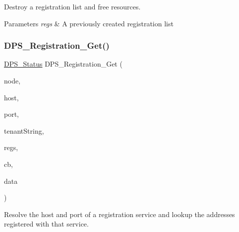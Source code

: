 Destroy a registration list and free resources. 


\begin{DoxyParams}{Parameters}
{\em regs} & A previously created registration list \\
\hline
\end{DoxyParams}
\mbox{\label{group__registration_ga7288d76e731feb67b22951d7d1966311}} 
\subsubsection{\texorpdfstring{D\+P\+S\+\_\+\+Registration\+\_\+\+Get()}{DPS\_Registration\_Get()}}
{\footnotesize\ttfamily \hyperlink{group__status_ga30395a84d3cad9d4ec29848106415038}{D\+P\+S\+\_\+\+Status} D\+P\+S\+\_\+\+Registration\+\_\+\+Get (\begin{DoxyParamCaption}\item[{\hyperlink{group__node_ga4dd612ab965134321bb57fdb065f121c}{D\+P\+S\+\_\+\+Node} $\ast$}]{node,  }\item[{const char $\ast$}]{host,  }\item[{uint16\+\_\+t}]{port,  }\item[{const char $\ast$}]{tenant\+String,  }\item[{\hyperlink{group__registration_ga2b9489ff306ad253d24b03c418a6eda0}{D\+P\+S\+\_\+\+Registration\+List} $\ast$}]{regs,  }\item[{\hyperlink{group__registration_gad6b4f95f999e950345587b5ae2de69e2}{D\+P\+S\+\_\+\+On\+Reg\+Get\+Complete}}]{cb,  }\item[{void $\ast$}]{data }\end{DoxyParamCaption})}



Resolve the host and port of a registration service and lookup the addresses registered with that service. 



